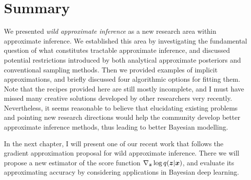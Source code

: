 \section{Summary}
We presented \emph{wild approximate inference} as a new research area within approximate inference. We established this area by investigating the fundamental question of what constitutes tractable approximate inference, and discussed potential restrictions introduced by both analytical approximate posteriors and conventional sampling methods. Then we provided examples of implicit approximations, and briefly discussed four algorithmic options for fitting them. Note that the recipes provided here are still mostly incomplete, and I must have missed many creative solutions developed by other researchers very recently. Nevertheless, it seems reasonable to believe that elucidating existing problems and pointing new research directions would help the community develop better approximate inference methods, thus leading to better Bayesian modelling.

%
In the next chapter, I will present one of our recent work that follows the gradient approximation proposal for wild approximate inference. There we will propose a new estimator of the score function $\nabla_{\bm{z}} \log q(\bm{z} | \bm{x})$, and evaluate its approximating accuracy by considering applications in Bayesian deep learning. 